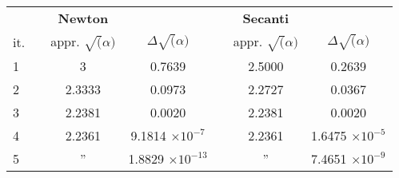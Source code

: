 \begin{tabular}{l*{6}{c}}
 & \vline& \textbf{Newton} & & \vline& \textbf{Secanti}\\
 it. & \vline& appr. \(\sqrt(\alpha)\) & \(\Delta\sqrt(\alpha)\) & \vline& appr. \(\sqrt(\alpha)\) & \(\Delta\sqrt(\alpha)\) \\
\hline
 1 & \vline& 3      & 0.7639				& \vline& 2.5000 & 0.2639 \\
 2 & \vline& 2.3333 & 0.0973				& \vline& 2.2727 & 0.0367 \\
 3 & \vline& 2.2381 & 0.0020				& \vline& 2.2381 & 0.0020 \\
 4 & \vline& 2.2361 & 9.1814 \(\times10^{-7}\) 	& \vline& 2.2361 & 1.6475 \(\times10^{-5}\) \\
 5 & \vline& ''     & 1.8829 \(\times10^{-13}\)	& \vline& ''     & 7.4651 \(\times10^{-9}\) \\

\end{tabular} \\

